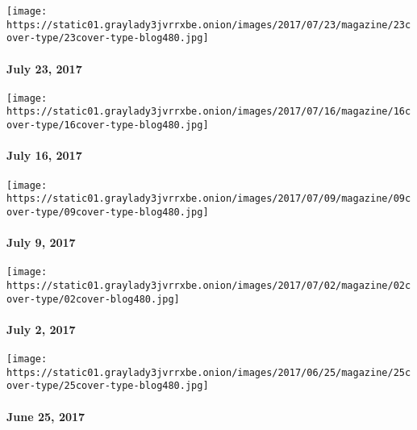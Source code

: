 \href{https://www.nytimes3xbfgragh.onion/issue/magazine/2017/07/21/magazine-index-20170723}{}

\texttt{[image: https://static01.graylady3jvrrxbe.onion/images/2017/07/23/magazine/23cover-type/23cover-type-blog480.jpg]}

\hypertarget{july-23-2017}{%
\paragraph{July 23, 2017}\label{july-23-2017}}

\href{https://www.nytimes3xbfgragh.onion/issue/magazine/2017/07/14/magazine-index-20170716}{}

\texttt{[image: https://static01.graylady3jvrrxbe.onion/images/2017/07/16/magazine/16cover-type/16cover-type-blog480.jpg]}

\hypertarget{july-16-2017}{%
\paragraph{July 16, 2017}\label{july-16-2017}}

\href{https://www.nytimes3xbfgragh.onion/issue/magazine/2017/07/07/magazine-index-20170709}{}

\texttt{[image: https://static01.graylady3jvrrxbe.onion/images/2017/07/09/magazine/09cover-type/09cover-type-blog480.jpg]}

\hypertarget{july-9-2017}{%
\paragraph{July 9, 2017}\label{july-9-2017}}

\href{https://www.nytimes3xbfgragh.onion/issue/magazine/2017/06/30/magazine-index-20170702}{}

\texttt{[image: https://static01.graylady3jvrrxbe.onion/images/2017/07/02/magazine/02cover-type/02cover-blog480.jpg]}

\hypertarget{july-2-2017}{%
\paragraph{July 2, 2017}\label{july-2-2017}}

\href{https://www.nytimes3xbfgragh.onion/issue/magazine/2017/06/23/magazine-index-20170625}{}

\texttt{[image: https://static01.graylady3jvrrxbe.onion/images/2017/06/25/magazine/25cover-type/25cover-type-blog480.jpg]}

\hypertarget{june-25-2017}{%
\paragraph{June 25, 2017}\label{june-25-2017}}

